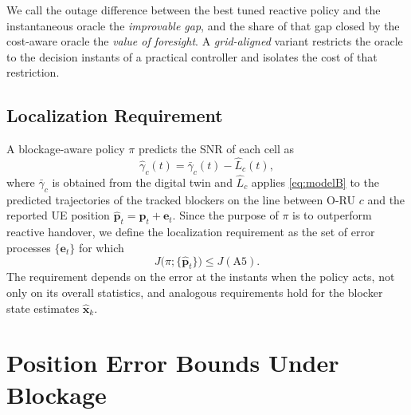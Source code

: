 \documentclass[journal]{IEEEtran}
\begin{document}
We call the outage difference between the best tuned reactive policy and
the instantaneous oracle the \emph{improvable gap}, and the share of that
gap closed by the cost-aware oracle the \emph{value of foresight}. A
\emph{grid-aligned} variant restricts the oracle to the decision instants
of a practical controller and isolates the cost of that restriction.

\subsection{Localization Requirement}
A blockage-aware policy $\pi$ predicts the SNR of each cell as
\begin{equation}
\hat\gamma_c(t)=\bar\gamma_c(t)-\hat L_c(t),
\label{eq:pred}
\end{equation}
where $\bar\gamma_c$ is obtained from the digital twin and $\hat L_c$
applies \eqref{eq:modelB} to the predicted trajectories of the tracked
blockers on the line between O-RU $c$ and the reported UE position
$\hat{\mathbf p}_t=\mathbf p_t+\mathbf e_t$. Since the purpose of $\pi$ is
to outperform reactive handover, we define the localization requirement
as the set of error processes $\{\mathbf e_t\}$ for which
\begin{equation}
J\bigl(\pi;\{\hat{\mathbf p}_t\}\bigr)\le J(\mathrm{A5}).
\label{eq:req}
\end{equation}
The requirement depends on the error at the instants when the policy
acts, not only on its overall statistics, and analogous requirements
hold for the blocker state estimates $\hat{\mathbf x}_k$.

\section{Position Error Bounds Under Blockage}
\end{document}
